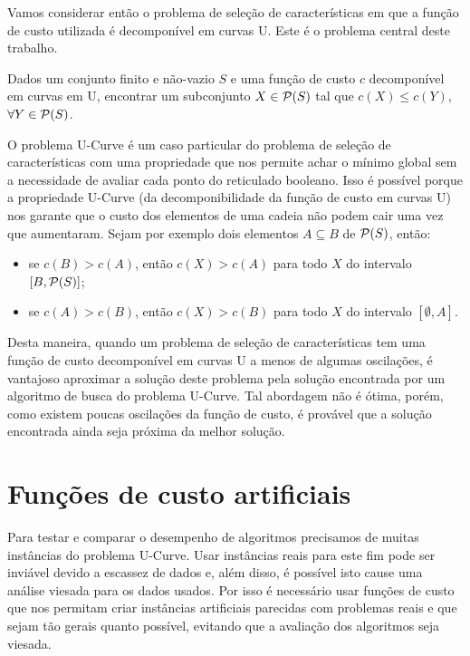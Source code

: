 Vamos considerar então o problema de seleção de características em que a
função de custo utilizada é decomponível em curvas U. Este é o problema 
central deste trabalho.

\begin{mydefinition}
Dados um conjunto finito e não-vazio $S$ e uma função de custo $c$ 
decomponível em curvas em U, encontrar um subconjunto $X \in 
\mathcal{P} (S)$ tal que $c(X) \leq c(Y)$,  $\forall Y \in \mathcal{P} (S)$.
\end{mydefinition}

O problema U-Curve é um caso particular do problema de seleção de 
características com uma propriedade que nos permite achar o mínimo
global sem a necessidade de avaliar cada ponto do reticulado booleano. 
Isso é possível porque a propriedade U-Curve (da decomponibilidade da 
função de custo em curvas U) nos garante que o custo dos elementos de 
uma cadeia não podem cair uma vez que aumentaram. Sejam por exemplo
dois elementos $A \subseteq B$ de $\mathcal{P} (S)$, então:
\begin{itemize}
    \item{se $c(B) > c (A)$, então $c (X) > c (A)$ para todo $X$
        do intervalo $[B, \mathcal{P} (S)]$;}
    \item{se $c(A) > c (B)$, então $c (X) > c (B)$ para todo $X$ 
        do intervalo $[\emptyset, A]$.}
\end{itemize}

Desta maneira, quando um problema de seleção de características tem uma 
função de custo decomponível em curvas U a menos de algumas oscilações,
é vantajoso aproximar a solução deste problema pela solução encontrada
por um algoritmo de busca do problema U-Curve. Tal abordagem não é 
ótima, porém, como existem poucas oscilações da função de custo, é 
provável que a solução encontrada ainda seja próxima da melhor solução.

\section{Funções de custo artificiais}
Para testar e comparar o desempenho de algoritmos precisamos de muitas 
instâncias do problema U-Curve. Usar instâncias reais para este fim pode
ser inviável devido a escassez de dados e, além disso, é possível isto
cause uma análise viesada para os dados usados. Por isso é necessário 
usar funções de custo que nos permitam criar instâncias artificiais 
parecidas com problemas reais e que sejam tão gerais quanto possível, 
evitando que a avaliação dos algoritmos seja viesada. 

